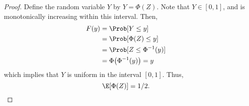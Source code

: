 \begin{proof}
  Define the random variable $Y$ by $Y = \Phi(Z)$. Note that $Y \in [0,1]$, and is monotonically increasing within this interval. Then,
  \begin{align*}
    F(y) &= \Prob[Y \leq y] \\
    &= \Prob[\Phi(Z) \leq y] \\
    &= \Prob[Z \leq \Phi^{-1}(y)] \\
    &= \Phi\big( \Phi^{-1}(y) \big) = y
  \end{align*}
  which implies that $Y$ is uniform in the interval $[0,1]$. Thus,
  \[
    \E[\Phi(Z)] = 1/2.
  \]
\end{proof}

%
